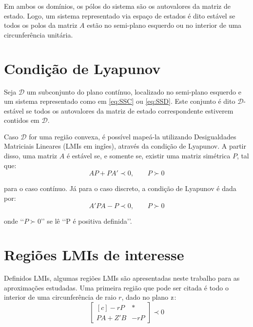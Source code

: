 Em ambos os domínios, os pólos do sistema são os autovalores da matriz de estado. Logo, um sistema representado via espaço de estados é dito estável se todos os polos da matriz $A$ estão no semi-plano esquerdo ou no interior de uma circunferência unitária.

\section{Condição de Lyapunov}\label{sec:LyapunovCondition}
Seja $\mathcal{D}$ um subconjunto do plano contínuo, localizado no semi-plano esquerdo e um sistema representado como em \eqref{eq:SSC} ou \eqref{eq:SSD}. Este conjunto é dito $\mathcal{D}$-estável se todos os autovalores da matriz de estado correspondente estiverem contidos em $\mathcal{D}$.

Caso $\mathcal{D}$ for uma região convexa, é possível mapeá-la utilizando Desigualdades Matriciais Lineares (LMIs em ingîes)\cite{CHILALI1996}, através da condição de Lyapunov. A partir disso, uma matriz $A$ é estável se, e somente se, existir uma matriz simétrica $P$, tal que:
\begin{equation}
AP + PA' \prec 0, \qquad P \succ 0\label{eq:LyapunovConditionS}
\end{equation}

\noindent para o caso contínuo. Já para o caso discreto, a condição de Lyapunov é dada por:
\begin{equation}
A'PA - P \prec 0, \qquad P \succ 0\label{eq:LyapunovConditionD}
\end{equation}

\noindent onde \lq{}\lq{}$P \succ 0$\rq{}\rq{} se lê \lq{}\lq{}P é positiva definida\rq{}\rq{}.

\section{Regiões LMIs de interesse}
Definidos LMIs, algumas regiões LMIs são apresentadas neste trabalho para as aproximações estudadas. Uma primeira região que pode ser citada é todo o interior de uma circunferência de raio $r$, dado no plano $\operatorname{\mathrm{z}}$:
\begin{equation}
\begin{bmatrix*}[c]
-rP & * \\
PA + Z'B & -rP
\end{bmatrix*}
\prec 0\label{eq:LMIEstabilidadeRelativa}
\end{equation}

